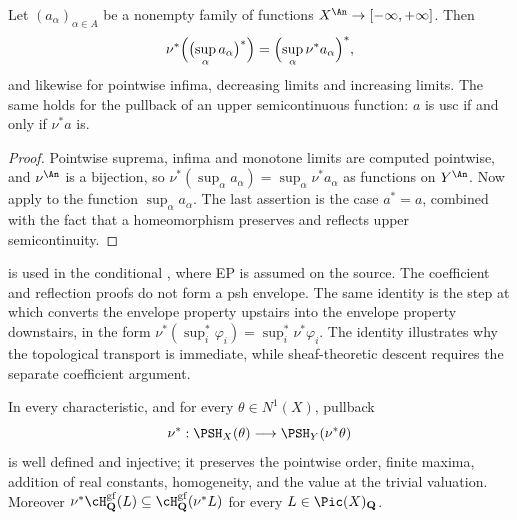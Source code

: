 \begin{corollary}
\label{cor:ch43-sup-star}
Let $(a_\alpha)_{\alpha\in A}$ be a nonempty family of functions
$X^{\An}\to[-\infty,+\infty]$.  Then
\[
 \nu^*\Bigl(\bigl(\sup_\alpha a_\alpha\bigr)^*\Bigr)
 =\Bigl(\sup_\alpha\nu^*a_\alpha\Bigr)^*,
\]
and likewise for pointwise infima, decreasing limits and increasing limits.
The same holds for the pullback of an upper semicontinuous function: $a$
is usc if and only if $\nu^*a$ is.
\end{corollary}

\begin{proof}
Pointwise suprema, infima and monotone limits are computed pointwise, and
$\nu^{\An}$ is a bijection, so
$\nu^*(\sup_\alpha a_\alpha)=\sup_\alpha\nu^*a_\alpha$ as functions on
$Y^{\An}$.  Now apply  to the function
$\sup_\alpha a_\alpha$.  The last assertion is the case $a^*=a$,
combined with the fact that a homeomorphism preserves and reflects upper
semicontinuity.
\end{proof}

\begin{remark}
\label{rem:ch43-sup-star-use}
 is used in the conditional
, where EP is assumed on the source.
The coefficient and reflection proofs do not form a psh envelope.
The same identity is the step at which
 converts the envelope property
upstairs into the envelope property downstairs, in the form
$\nu^*(\sup^*_i\varphi_i)=\sup^*_i\nu^*\varphi_i$.
The identity illustrates why the topological transport is immediate,
while sheaf-theoretic descent requires the separate coefficient argument.
\end{remark}

\begin{proposition}
\label{prop:ch43-free-half}
In every characteristic, and for every $\theta\in N^1(X)$, pullback
\[
 \nu^*:\PSH_X(\theta)\longrightarrow\PSH_Y(\nu^*\theta)
\]
is well defined and injective; it preserves the pointwise order, finite
maxima, addition of real constants, homogeneity, and the value at the
trivial valuation.  Moreover
$\nu^*\cH^{\mathrm{gf}}_{\mathbf Q}(L)\subseteq
\cH^{\mathrm{gf}}_{\mathbf Q}(\nu^*L)$ for every
$L\in\Pic(X)_{\mathbf Q}$.
\end{proposition}

